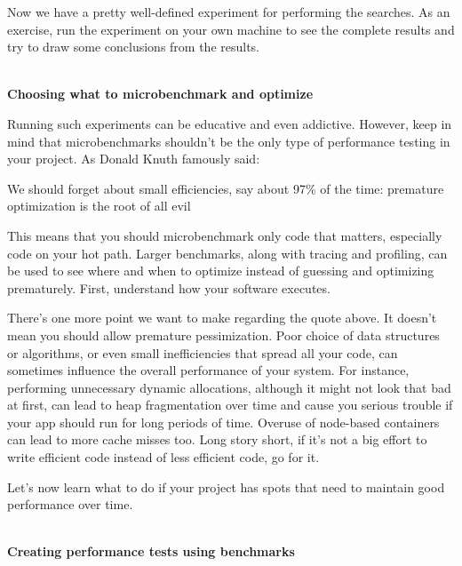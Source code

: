 Now we have a pretty well-defined experiment for performing the searches. As an exercise, run the experiment on your own machine to see the complete results and try to draw some conclusions from the results.

\hspace*{\fill} \\ %
\noindent
\textbf{Choosing what to microbenchmark and optimize}

Running such experiments can be educative and even addictive. However, keep in mind that microbenchmarks shouldn't be the only type of performance testing in your project. As Donald Knuth famously said:

\begin{center}
We should forget about small efficiencies, say about 97\% of the time: premature optimization is the root of all evil	
\end{center}

This means that you should microbenchmark only code that matters, especially code on your hot path. Larger benchmarks, along with tracing and profiling, can be used to see where and when to optimize instead of guessing and optimizing prematurely. First, understand how your software executes.

\begin{tcolorbox}[colback=blue!5!white,colframe=blue!75!black, title=Note]
\hspace*{0.7cm}There's one more point we want to make regarding the quote above. It doesn't mean you should allow premature pessimization. Poor choice of data structures or algorithms, or even small inefficiencies that spread all your code, can sometimes influence the overall performance of your system. For instance, performing unnecessary dynamic allocations, although it might not look that bad at first, can lead to heap fragmentation over time and cause you serious trouble if your app should run for long periods of time. Overuse of node-based containers can lead to more cache misses too. Long story short, if it's not a big effort to write efficient code instead of less efficient code, go for it.
\end{tcolorbox}

Let's now learn what to do if your project has spots that need to maintain good performance over time.

\hspace*{\fill} \\ %
\noindent
\textbf{Creating performance tests using benchmarks}

